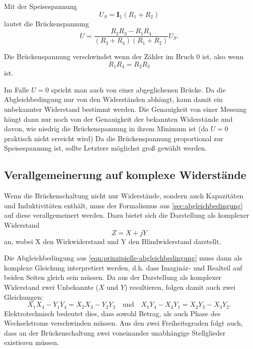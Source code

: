 Mit der Speisespannung
\begin{equation}
	U_S = \mathbf{I}_1 (R_1 + R_2)
	\label{eqn:speisespannung}
\end{equation}
lautet die Brückenspannung
\begin{equation}
	U = \frac{R_2 R_3 - R_1 R_4}{(R_3 + R_4)(R_1 + R_2)} U_S.
	\label{eqn:brueckenspannung-unabhaengig}
\end{equation}

Die Brückenspannung verschwindet wenn der Zähler im Bruch 0 ist, also wenn
\begin{equation}
	R_1R_4 = R_2R_3
	\label{eqn:prinzipielle-abgleichbedingung}
\end{equation}
ist.

Im Falle $U=0$ spricht man auch von einer abgeglichenen Brücke. Da die 
Abgleichbedingung nur von den Widerständen abhängt, kann damit ein unbekannter Widerstand
bestimmt werden. Die Genauigkeit von einer Messung hängt dann nur noch von der Genauigkeit
der bekannten Widerstände und davon, wie niedrig die Brückenspannung in ihrem Minimum ist
(da $U=0$ praktisch nicht erreicht wird)
Da die Brückenspannung proportional zur Speisespannung ist, sollte Letztere möglichst
groß gewählt werden.

\subsection{Verallgemeinerung auf komplexe Widerstände}
\label{sec:komplexe-widerstände}
Wenn die Brückenschaltung nicht nur Widerstände, sondern auch Kapazitäten und Induktivitäten
enthält, muss der Formalismus aus \autoref{sec:abgleichbedingung} auf diese verallgemeinert
werden. Dazu bietet sich die Darstellung als komplexer Widerstand
\begin{equation}
	Z = X + jY
	\label{eqn:komplexer-widerstand}
\end{equation}
an, wobei X den  Wirkwiderstand und Y den Blindwiderstand darstellt.

Die Abgleichbedingung aus \autoref{eqn:prinzipielle-abgleichbedingung} muss dann als komplexe
Gleichung interpretiert werden, d.h. dass Imaginär- und Realteil auf beiden Seiten gleich sein
müssen. Da aus der Darstellung als komplexer Widerstand zwei Unbekannte ($X$ und $Y$) resultieren,
folgen damit auch zwei Gleichungen:
\begin{equation}
	X_1X_4 - Y_1Y_4 = X_2X_3 - Y_2Y_3 
	\quad \text{und} \quad
	X_1Y_4 - X_4Y_1 = X_2Y_3 - X_3Y_2.
	\label{eqn:komplexe-abgleichbedingung}
\end{equation}
Elektrotechnisch bedeutet dies, dass sowohl Betrag, als auch Phase des Wechselstroms verschwinden
müssen. Aus den zwei Freiheitsgraden folgt auch, dass an der Brückenschaltung zwei voneinander
unabhängige Stellglieder existieren müssen.


